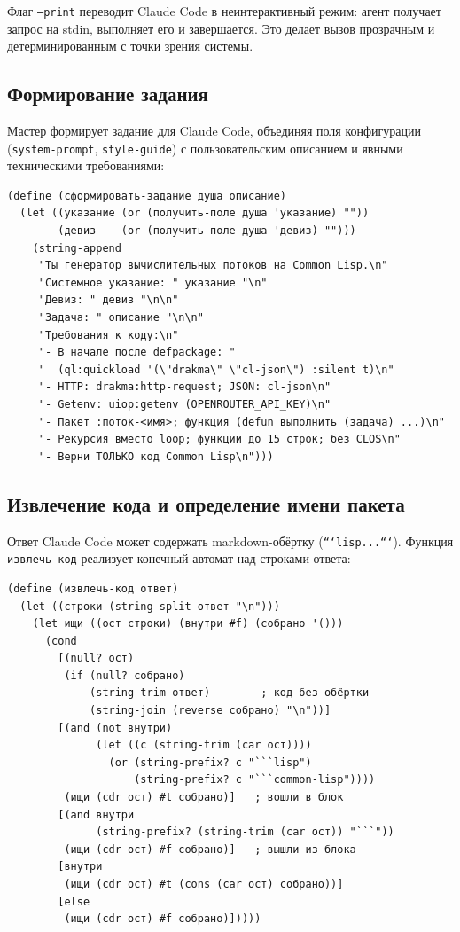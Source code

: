 \documentclass[11pt,a4paper]{article}
\begin{document}
Флаг \texttt{--print} переводит Claude Code в неинтерактивный режим: агент
получает запрос на stdin, выполняет его и завершается. Это делает вызов
прозрачным и детерминированным с точки зрения системы.

\subsection{Формирование задания}

Мастер формирует задание для Claude Code, объединяя поля конфигурации
(\texttt{system-prompt}, \texttt{style-guide}) с пользовательским описанием
и явными техническими требованиями:

\begin{lstlisting}[language=Racket, caption={Формирование задания для генератора кода}]
(define (сформировать-задание душа описание)
  (let ((указание (or (получить-поле душа 'указание) ""))
        (девиз    (or (получить-поле душа 'девиз) "")))
    (string-append
     "Ты генератор вычислительных потоков на Common Lisp.\n"
     "Системное указание: " указание "\n"
     "Девиз: " девиз "\n\n"
     "Задача: " описание "\n\n"
     "Требования к коду:\n"
     "- В начале после defpackage: "
     "  (ql:quickload '(\"drakma\" \"cl-json\") :silent t)\n"
     "- HTTP: drakma:http-request; JSON: cl-json\n"
     "- Getenv: uiop:getenv (OPENROUTER_API_KEY)\n"
     "- Пакет :поток-<имя>; функция (defun выполнить (задача) ...)\n"
     "- Рекурсия вместо loop; функции до 15 строк; без CLOS\n"
     "- Верни ТОЛЬКО код Common Lisp\n")))
\end{lstlisting}

\subsection{Извлечение кода и определение имени пакета}

Ответ Claude Code может содержать markdown-обёртку (\texttt{```lisp...```}).
Функция \texttt{извлечь-код} реализует конечный автомат над строками ответа:

\begin{lstlisting}[language=Racket, caption={Извлечение кода из ответа (конечный автомат)}]
(define (извлечь-код ответ)
  (let ((строки (string-split ответ "\n")))
    (let ищи ((ост строки) (внутри #f) (собрано '()))
      (cond
        [(null? ост)
         (if (null? собрано)
             (string-trim ответ)        ; код без обёртки
             (string-join (reverse собрано) "\n"))]
        [(and (not внутри)
              (let ((с (string-trim (car ост))))
                (or (string-prefix? с "```lisp")
                    (string-prefix? с "```common-lisp"))))
         (ищи (cdr ост) #t собрано)]   ; вошли в блок
        [(and внутри
              (string-prefix? (string-trim (car ост)) "```"))
         (ищи (cdr ост) #f собрано)]   ; вышли из блока
        [внутри
         (ищи (cdr ост) #t (cons (car ост) собрано))]
        [else
         (ищи (cdr ост) #f собрано)]))))
\end{lstlisting}
\end{document}
